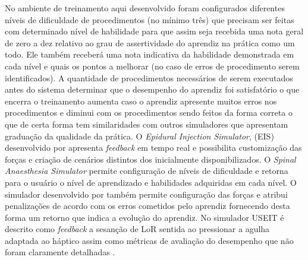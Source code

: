 No ambiente de treinamento aqui desenvolvido foram configurados diferentes níveis de dificuldade de procedimentos (no mínimo três) que precisam ser feitas com determinado nível de habilidade para que assim seja recebida uma nota geral de zero a dez relativo ao grau de assertividade do aprendiz na prática como um todo. Ele também receberá uma nota indicativa da habilidade demonstrada em cada nível e quais os pontos a melhorar (no caso de erros de procedimento serem identificados). A quantidade de procedimentos necessários de serem executados antes do sistema determinar que o desempenho do aprendiz foi satisfatório o que encerra o treinamento aumenta caso o aprendiz apresente muitos erros nos procedimentos e diminui com os procedimentos sendo feitos da forma correta o que de certa forma tem similaridades com outros simuladores que apresentam graduação da qualidade da prática. O \textit{Epidural Injection Simulator}, (EIS) desenvolvido por \textcite{Wilson2003} apresenta \textit{feedback} em tempo real e possibilita customização das forças e criação de cenários distintos dos inicialmente disponibilizados. O \textit{Spinal Anaesthesia Simulator} \cite{Albert2007,Dreifaldt2006} permite configuração de níveis de dificuldade e retorna para o usuário o nível de aprendizado e habilidades adquiridas em cada nível. O simulador desenvolvido por \textcite{Brazil2017thesis} também permite configuração das forças e atribui penalizações de acordo com os erros cometidos pelo aprendiz fornecendo desta forma um retorno que indica a evolução do aprendiz. No simulador USEIT é descrito como \textit{feedback} a sesanção de \acrshort{LoR} sentida ao pressionar a agulha adaptada ao háptico assim como métricas de avaliação do desempenho que não foram claramente detalhadas \cite{Moo-Young202}. 
